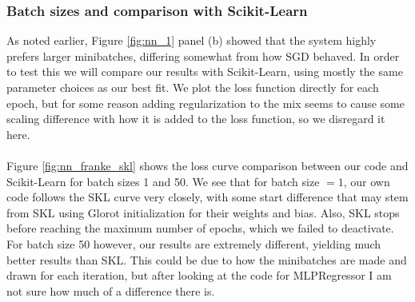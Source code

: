 \documentclass[a4paper]{article}
\begin{document}
\subsubsection*{Batch sizes and comparison with Scikit-Learn}
As noted earlier, Figure \ref{fig:nn_1} panel (b) showed that the system highly prefers larger minibatches, differing somewhat from how SGD behaved. In order to test this we will compare our results with Scikit-Learn, using mostly the same parameter choices as our best fit. We plot the loss function directly for each epoch, but for some reason adding regularization to the mix seems to cause some scaling difference with how it is added to the loss function, so we disregard it here.
\\\\
Figure \ref{fig:nn_franke_skl} shows the loss curve comparison between our code and Scikit-Learn for batch sizes 1 and 50. We see that for batch size $=1$, our own code follows the SKL curve very closely, with some start difference that may stem from SKL using Glorot initialization \cite{glorot} for their weights and bias. Also, SKL stops before reaching the maximum number of epochs, which we failed to deactivate. For batch size 50 however, our results are extremely different, yielding much better results than SKL. This could be due to how the minibatches are made and drawn for each iteration, but after looking at the code for MLPRegressor I am not sure how much of a difference there is.
\end{document}
